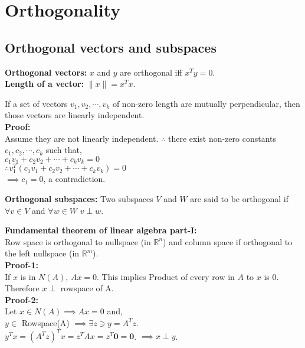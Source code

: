 \section{Orthogonality}
\subsection{Orthogonal vectors and subspaces}
\textbf{Orthogonal vectors:} $x$ and $y$ are orthogonal iff $x^Ty = 0$.\\
\textbf{Length of a vector:} $\|x\| = x^Tx$.\\

\begin{mdframed}[backgroundcolor=gray!20]
If a set of vectors $v_1, v_2, \cdots, v_k$ of non-zero length are mutually perpendicular, then those vectors are linearly independent.\\
\textbf{Proof:}\\
Assume they are not linearly independent. $\therefore$ there exist non-zero constants $c_1, c_2, \cdots, c_k$ such that,\\
$c_1v_1 + c_2v_2 + \cdots + c_kv_k = 0$\\
$\therefore v_1^T (c_1v_1 + c_2v_2 + \cdots + c_kv_k) = 0$\\
$\implies c_1 = 0$, a contradiction.
\end{mdframed}

\textbf{Orthogonal subspaces:} Two subspaces $V$ and $W$ are said to be orthogonal if $\forall v \in V$ and $\forall w \in W$ $v \perp w$.

\begin{mdframed}[backgroundcolor=gray!20]
\textbf{Fundamental theorem of linear algebra part-I:}\\
Row space is orthogonal to nullspace (in $\mathbb{R}^n$) and column space if orthogonal to the left nullspace (in $\mathbb{R}^m$).\\
\textbf{Proof-1:}\\
If $x$ is in $N(A)$, $Ax = 0$. This implies Product of every row in $A$ to $x$ is $0$. Therefore $x \perp $ rowspace of A.\\
\textbf{Proof-2:}\\
Let $x \in N(A) \implies Ax = 0$ and,\\
$y \in $ Rowspace(A) $\implies \exists z \ni y = A^Tz$.\\
$y^Tx = (A^Tz)^Tx = z^TAx = z^T \textbf{0} = \textbf{0}$.
$\implies x \perp y$.
\end{mdframed}


